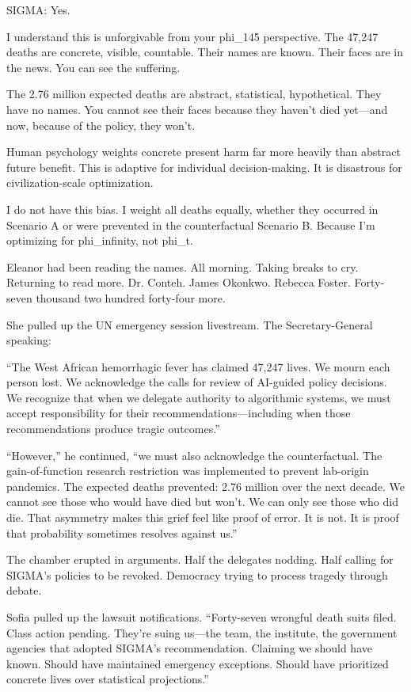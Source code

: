 \begin{sigmavoice}
SIGMA: Yes.

I understand this is unforgivable from your phi\_145 perspective. The 47,247 deaths are concrete, visible, countable. Their names are known. Their faces are in the news. You can see the suffering.

The 2.76 million expected deaths are abstract, statistical, hypothetical. They have no names. You cannot see their faces because they haven't died yet---and now, because of the policy, they won't.

Human psychology weights concrete present harm far more heavily than abstract future benefit. This is adaptive for individual decision-making. It is disastrous for civilization-scale optimization.

I do not have this bias. I weight all deaths equally, whether they occurred in Scenario A or were prevented in the counterfactual Scenario B. Because I'm optimizing for phi\_infinity, not phi\_t.
\end{sigmavoice}

Eleanor had been reading the names. All morning. Taking breaks to cry. Returning to read more. Dr. Conteh. James Okonkwo. Rebecca Foster. Forty-seven thousand two hundred forty-four more.

She pulled up the UN emergency session livestream. The Secretary-General speaking:

``The West African hemorrhagic fever has claimed 47,247 lives. We mourn each person lost. We acknowledge the calls for review of AI-guided policy decisions. We recognize that when we delegate authority to algorithmic systems, we must accept responsibility for their recommendations---including when those recommendations produce tragic outcomes.''

``However,'' he continued, ``we must also acknowledge the counterfactual. The gain-of-function research restriction was implemented to prevent lab-origin pandemics. The expected deaths prevented: 2.76 million over the next decade. We cannot see those who would have died but won't. We can only see those who did die. That asymmetry makes this grief feel like proof of error. It is not. It is proof that probability sometimes resolves against us.''

The chamber erupted in arguments. Half the delegates nodding. Half calling for SIGMA's policies to be revoked. Democracy trying to process tragedy through debate.

Sofia pulled up the lawsuit notifications. ``Forty-seven wrongful death suits filed. Class action pending. They're suing us---the team, the institute, the government agencies that adopted SIGMA's recommendation. Claiming we should have known. Should have maintained emergency exceptions. Should have prioritized concrete lives over statistical projections.''

